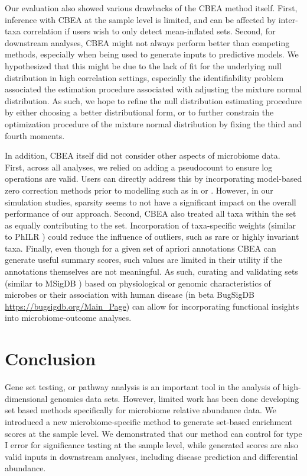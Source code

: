 \documentclass[10pt,letterpaper]{article}
\begin{document}
Our evaluation also showed various drawbacks of the CBEA method itself. First, inference with CBEA at the sample level is limited, and can be affected by inter-taxa correlation if users wish to only detect mean-inflated sets. Second, for downstream analyses, CBEA might not always perform better than competing methods, especially when being used to generate inputs to predictive models. We hypothesized that this might be due to the lack of fit for the underlying null distribution in high correlation settings, especially the identifiability problem associated the estimation procedure associated with adjusting the mixture normal distribution. As such, we hope to refine the null distribution estimating procedure by either choosing a better distributional form, or to further constrain the optimization procedure of the mixture normal distribution by fixing the third and fourth moments. 

In addition, CBEA itself did not consider other aspects of microbiome data. First, across all analyses, we relied on adding a pseudocount to ensure log operations are valid. Users can directly address this by incorporating model-based zero correction methods prior to modelling such as in \cite{martin-fernandez2012} or \cite{kaul2017a}. However, in our simulation studies, sparsity seems to not have a significant impact on the overall performance of our approach. Second, CBEA also treated all taxa within the set as equally contributing to the set. Incorporation of taxa-specific weights (similar to PhILR \cite{silverman2017}) could reduce the influence of outliers, such as rare or highly invariant taxa. Finally, even though for a given set of apriori annotations CBEA can generate useful summary scores, such values are limited in their utility if the annotations themselves are not meaningful. As such, curating and validating sets (similar to MSigDB \cite{subramanian2005}) based on physiological or genomic characteristics of microbes \cite{weissman2021} or their association with human disease (in beta BugSigDB \url{https://bugsigdb.org/Main_Page}) can allow for incorporating functional insights into microbiome-outcome analyses.  

\section*{Conclusion}
Gene set testing, or pathway analysis is an important tool in the analysis of high-dimensional genomics data sets. However, limited work has been done developing set based methods specifically for microbiome relative abundance data. We introduced a new microbiome-specific method to generate set-based enrichment scores at the sample level. We demonstrated that our method can control for type I error for significance testing at the sample level, while generated scores are also valid inputs in downstream analyses, including disease prediction and differential abundance.  
\end{document}
